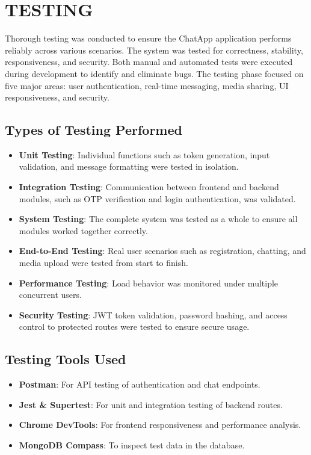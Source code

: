 \documentclass[12pt,a4paper]{report}
\begin{document}
\newpage






\chapter{TESTING}

Thorough testing was conducted to ensure the ChatApp application performs reliably across various scenarios. The system was tested for correctness, stability, responsiveness, and security. Both manual and automated tests were executed during development to identify and eliminate bugs. The testing phase focused on five major areas: user authentication, real-time messaging, media sharing, UI responsiveness, and security.

\section{Types of Testing Performed}

\begin{itemize}
    \item \textbf{Unit Testing}: Individual functions such as token generation, input validation, and message formatting were tested in isolation.
    \item \textbf{Integration Testing}: Communication between frontend and backend modules, such as OTP verification and login authentication, was validated.
    \item \textbf{System Testing}: The complete system was tested as a whole to ensure all modules worked together correctly.
    \item \textbf{End-to-End Testing}: Real user scenarios such as registration, chatting, and media upload were tested from start to finish.
    \item \textbf{Performance Testing}: Load behavior was monitored under multiple concurrent users.
    \item \textbf{Security Testing}: JWT token validation, password hashing, and access control to protected routes were tested to ensure secure usage.
\end{itemize}

\section{Testing Tools Used}

\begin{itemize}
    \item \textbf{Postman}: For API testing of authentication and chat endpoints.
    \item \textbf{Jest \& Supertest}: For unit and integration testing of backend routes.
    \item \textbf{Chrome DevTools}: For frontend responsiveness and performance analysis.
    \item \textbf{MongoDB Compass}: To inspect test data in the database.
\end{itemize}
\end{document}
